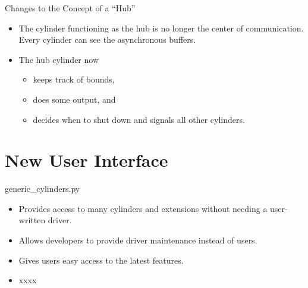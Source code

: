 \documentclass[9pt,usenames,dvipsnames]{beamer}
\begin{document}
\begin{frame}{Changes to the Concept of a ``Hub''}
  \begin{itemize}
    \item The cylinder functioning as the hub is no longer the center of communication. Every cylinder can see the asynchronous buffers.
    \item The hub cylinder now
      \begin{itemize}
      \item keeps track of bounds,
      \item does some output, and
        \item decides when to shut down and signals all other cylinders.
        \end{itemize}
  \end{itemize}
\end{frame}

\section{New User Interface}
\begin{frame}{generic\_cylinders.py}
  \begin{itemize}
  \item Provides access to many cylinders and extensions without needing a user-written driver.
  \item Allows developers to provide driver maintenance instead of users.
  \item Gives users easy access to the latest features.
    \item xxxx
    \end{itemize}
\end{frame}
\end{document}
